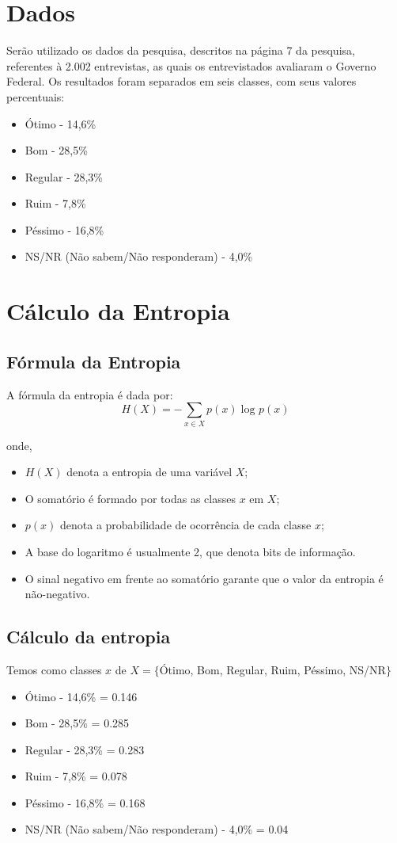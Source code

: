 \documentclass[12pt, a4paper]{article}
\begin{document}
\section{Dados}
Serão utilizado os dados da pesquisa, descritos na página 7 da pesquisa, referentes à 2.002 entrevistas, as quais os entrevistados avaliaram o Governo Federal. Os resultados foram separados em seis classes, com seus valores percentuais:

\begin{itemize}
\item Ótimo - 14,6\%
\item Bom - 28,5\% 
\item Regular - 28,3\%
\item Ruim - 7,8\% 
\item Péssimo - 16,8\% 
\item NS/NR (Não sabem/Não responderam) - 4,0\% 
\end{itemize}

\section{Cálculo da Entropia}
\subsection{Fórmula da Entropia}
A fórmula da entropia é dada por:
$$
H(X) = - \sum_{x \in X} p(x) \log_{} p(x)
$$

\noindent onde,
\begin{itemize}
\item $H(X)$ denota a entropia de uma variável $X$;
\item O somatório é formado por todas as classes $x$ em $X$;
\item $p(x)$ denota a probabilidade de ocorrência de cada classe $x$;
\item A base do logaritmo é usualmente 2, que denota bits de informação.
\item O sinal negativo em frente ao somatório garante que o valor da entropia é não-negativo.
\end{itemize}

\subsection{Cálculo da entropia}
Temos como classes $x$ de $X = \{$Ótimo, Bom, Regular, Ruim, Péssimo, NS/NR$\}$
\\
\begin{itemize}
\item Ótimo - 14,6\% = 0.146
\item Bom - 28,5\% = 0.285
\item Regular - 28,3\% = 0.283
\item Ruim - 7,8\% = 0.078
\item Péssimo - 16,8\% = 0.168
\item NS/NR (Não sabem/Não responderam) - 4,0\% = 0.04
\end{itemize} \\
\end{document}
